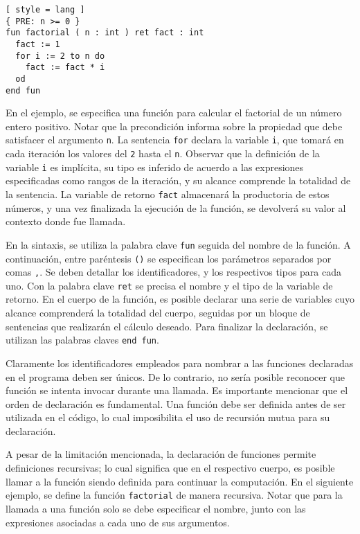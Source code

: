 \begin{lstlisting}[ style = lang ]
{ PRE: n >= 0 }
fun factorial ( n : int ) ret fact : int
  fact := 1
  for i := 2 to n do
    fact := fact * i
  od
end fun
\end{lstlisting}

En el ejemplo, se especifica una función para calcular el factorial de un número entero positivo.
Notar que la precondición informa sobre la propiedad que debe satisfacer el argumento \lstinline[style = lang]{n}.
La sentencia \lstinline[style = lang]{for} declara la variable \lstinline[style = lang]{i}, que tomará en cada iteración los valores del \lstinline[style = lang]{2} hasta el \lstinline[style = lang]{n}.
Observar que la definición de la variable \lstinline[style = lang]{i} es implícita, su tipo es inferido de acuerdo a las expresiones especificadas como rangos de la iteración, y su alcance comprende la totalidad de la sentencia.
La variable de retorno \lstinline[style = lang]{fact} almacenará la productoria de estos números, y una vez finalizada la ejecución de la función, se devolverá su valor al contexto donde fue llamada.

En la sintaxis, se utiliza la palabra clave \lstinline[style = lang]{fun} seguida del nombre de la función.
A continuación, entre paréntesis \lstinline[style = lang]{()} se especifican los parámetros separados por comas \lstinline[style = lang]{,}.
Se deben detallar los identificadores, y los respectivos tipos para cada uno.
Con la palabra clave \lstinline[style = lang]{ret} se precisa el nombre y el tipo de la variable de retorno.
En el cuerpo de la función, es posible declarar una serie de variables cuyo alcance comprenderá la totalidad del cuerpo, seguidas por un bloque de sentencias que realizarán el cálculo deseado.
Para finalizar la declaración, se utilizan las palabras claves \lstinline[style = lang]{end fun}.

Claramente los identificadores empleados para nombrar a las funciones declaradas en el programa deben ser únicos.
De lo contrario, no sería posible reconocer que función se intenta invocar durante una llamada.
Es importante mencionar que el orden de declaración es fundamental.
Una función debe ser definida antes de ser utilizada en el código, lo cual imposibilita el uso de recursión mutua para su declaración.

A pesar de la limitación mencionada, la declaración de funciones permite definiciones recursivas; lo cual significa que en el respectivo cuerpo, es posible llamar a la función siendo definida para continuar la computación.
En el siguiente ejemplo, se define la función \lstinline[style = lang]{factorial} de manera recursiva.
Notar que para la llamada a una función solo se debe especificar el nombre, junto con las expresiones asociadas a cada uno de sus argumentos.

